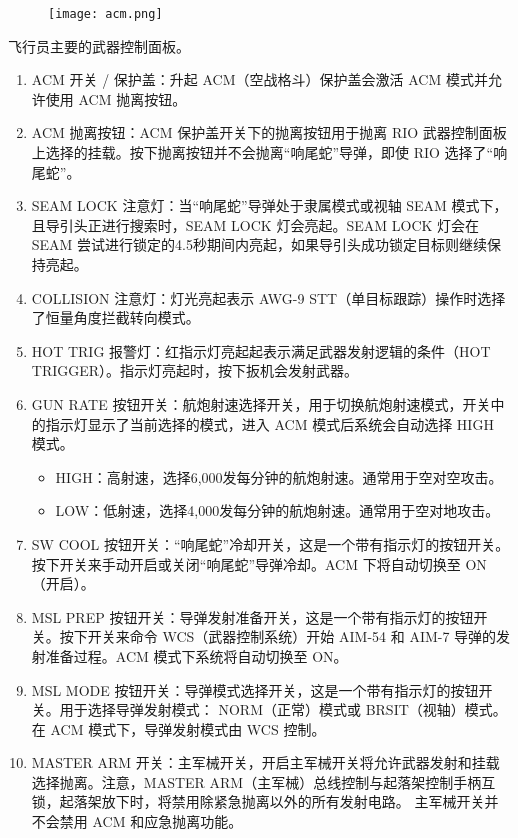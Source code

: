 \begin{figure}[htb]
  \center
  \texttt{[image: acm.png]}
\end{figure}
飞行员主要的武器控制面板。

\begin{enumerate}
  \item ACM 开关 / 保护盖：升起 ACM（空战格斗）保护盖会激活 ACM 模式并允许使用 ACM 抛离按钮。
  \item ACM 抛离按钮：ACM 保护盖开关下的抛离按钮用于抛离 RIO 武器控制面板上选择的挂载。按下抛离按钮并不会抛离“响尾蛇”导弹，即使 RIO 选择了“响尾蛇”。
  \item SEAM LOCK 注意灯：当“响尾蛇”导弹处于隶属模式或视轴 SEAM 模式下，且导引头正进行搜索时，SEAM LOCK 灯会亮起。SEAM LOCK 灯会在 SEAM 尝试进行锁定的4.5秒期间内亮起，如果导引头成功锁定目标则继续保持亮起。
  \item COLLISION 注意灯：灯光亮起表示 AWG-9 STT（单目标跟踪）操作时选择了恒量角度拦截转向模式。
  \item HOT TRIG 报警灯：红指示灯亮起起表示满足武器发射逻辑的条件（HOT TRIGGER）。指示灯亮起时，按下扳机会发射武器。
  \item GUN RATE 按钮开关：航炮射速选择开关，用于切换航炮射速模式，开关中的指示灯显示了当前选择的模式，进入 ACM 模式后系统会自动选择 HIGH 模式。
  \begin{itemize}
    \item HIGH：高射速，选择6,000发每分钟的航炮射速。通常用于空对空攻击。
    \item LOW：低射速，选择4,000发每分钟的航炮射速。通常用于空对地攻击。
  \end{itemize}
  \item SW COOL 按钮开关：“响尾蛇”冷却开关，这是一个带有指示灯的按钮开关。按下开关来手动开启或关闭“响尾蛇”导弹冷却。ACM 下将自动切换至 ON（开启）。
  \item MSL PREP 按钮开关：导弹发射准备开关，这是一个带有指示灯的按钮开关。按下开关来命令 WCS（武器控制系统）开始 AIM-54 和 AIM-7 导弹的发射准备过程。ACM 模式下系统将自动切换至 ON。
  \item MSL MODE 按钮开关：导弹模式选择开关，这是一个带有指示灯的按钮开关。用于选择导弹发射模式： NORM（正常）模式或 BRSIT（视轴）模式。在 ACM 模式下，导弹发射模式由 WCS 控制。
  \item MASTER ARM 开关：主军械开关，开启主军械开关将允许武器发射和挂载选择抛离。注意，MASTER ARM（主军械）总线控制与起落架控制手柄互锁，起落架放下时，将禁用除紧急抛离以外的所有发射电路。	主军械开关并不会禁用 ACM 和应急抛离功能。
  \begin{itemize}

\end{itemize}
\end{enumerate}
